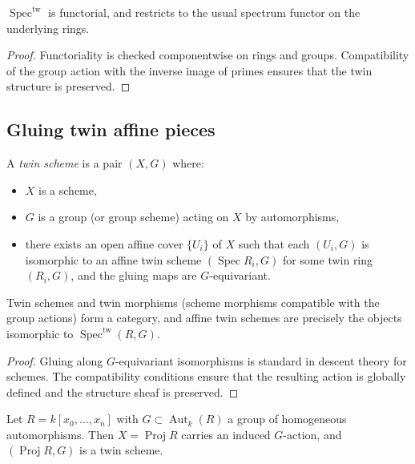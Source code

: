 \documentclass[11pt,a4paper]{article}
\numberwithin{equation}{section}
\DeclareMathOperator{\Spec}{Spec}
\DeclareMathOperator{\Proj}{Proj}
\DeclareMathOperator{\Aut}{Aut}
\begin{document}
	\begin{proposition}
		$\Spec^{\mathrm{tw}}$ is functorial, and restricts to the usual spectrum functor on the underlying rings.
	\end{proposition}
	
	\begin{proof}
		Functoriality is checked componentwise on rings and groups. Compatibility of the group action with the
		inverse image of primes ensures that the twin structure is preserved.
	\end{proof}
	
	\subsection{Gluing twin affine pieces}
	
	\begin{definition}
		A \emph{twin scheme} is a pair $(X,G)$ where:
		\begin{itemize}
			\item $X$ is a scheme,
			\item $G$ is a group (or group scheme) acting on $X$ by automorphisms,
			\item there exists an open affine cover $\{U_i\}$ of $X$ such that each $(U_i,G)$ is isomorphic
			to an affine twin scheme $(\Spec R_i,G)$ for some twin ring $(R_i,G)$, and the gluing maps
			are $G$-equivariant.
		\end{itemize}
	\end{definition}
	
	\begin{proposition}
		Twin schemes and twin morphisms (scheme morphisms compatible with the group actions) form a category,
		and affine twin schemes are precisely the objects isomorphic to $\Spec^{\mathrm{tw}}(R,G)$.
	\end{proposition}
	
	\begin{proof}
		Gluing along $G$-equivariant isomorphisms is standard in descent theory for schemes.
		The compatibility conditions ensure that the resulting action is globally defined and the structure sheaf 
		is preserved.
	\end{proof}
	
	\begin{example}
		Let $R=k[x_0,\dots,x_n]$ with $G\subset\Aut_k(R)$ a group of homogeneous automorphisms.
		Then $X=\Proj R$ carries an induced $G$-action, and $(\Proj R,G)$ is a twin scheme.
	\end{example}
	
\end{document}
